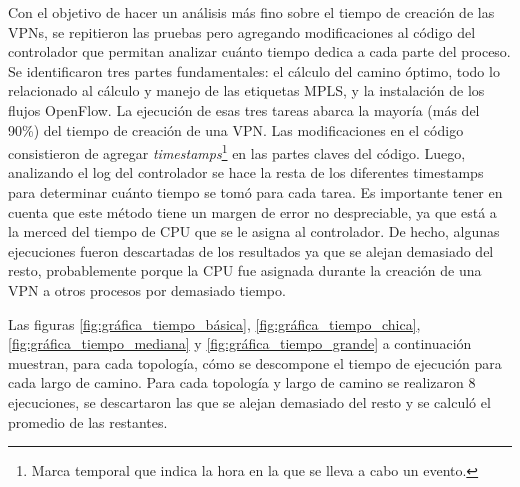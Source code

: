 Con el objetivo de hacer un análisis más fino sobre el tiempo de creación de las VPNs, se repitieron las pruebas pero agregando modificaciones al código del controlador que permitan analizar cuánto tiempo dedica a cada parte del proceso. Se identificaron tres partes fundamentales: el cálculo del camino óptimo, todo lo relacionado al cálculo y manejo de las etiquetas MPLS, y la instalación de los flujos OpenFlow. La ejecución de esas tres tareas abarca la mayoría (más del 90\%) del tiempo de creación de una VPN. Las modificaciones en el código consistieron de agregar \textit{timestamps}\footnote{Marca temporal que indica la hora en la que se lleva a cabo un evento.} en las partes claves del código. Luego, analizando el log del controlador se hace la resta de los diferentes timestamps para determinar cuánto tiempo se tomó para cada tarea. Es importante tener en cuenta que este método tiene un margen de error no despreciable, ya que está a la merced del tiempo de CPU que se le asigna al controlador. De hecho, algunas ejecuciones fueron descartadas de los resultados ya que se alejan demasiado del resto, probablemente porque la CPU fue asignada durante la creación de una VPN a otros procesos por demasiado tiempo.


Las figuras \ref{fig:gráfica_tiempo_básica}, \ref{fig:gráfica_tiempo_chica}, \ref{fig:gráfica_tiempo_mediana} y \ref{fig:gráfica_tiempo_grande} a continuación muestran, para cada topología, cómo se descompone el tiempo de ejecución para cada largo de camino. Para cada topología y largo de camino se realizaron 8 ejecuciones, se descartaron las que se alejan demasiado del resto y se calculó el promedio de las restantes.

